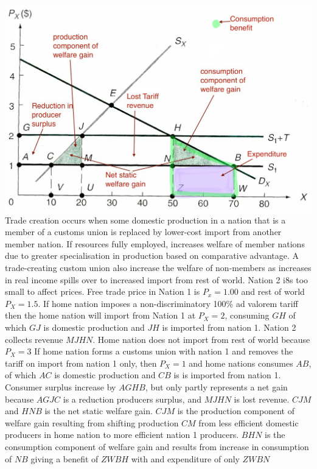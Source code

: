 \documentclass[12pt]{examnotes}
\begin{document}
\includegraphics[scale=0.4]{./imgs/101.jpg}
\ra Trade creation occurs when some domestic production in a nation that is a member of a customs union is replaced by lower-cost import from another member nation.
\ra If resources fully employed, increases welfare of member nations due to greater specialisation in production based on comparative advantage.
\ra A trade-creating custom union also increase the welfare of non-members as increases in real income spills over to increased import from rest of world.
\ra Nation 2 i8s too small to affect prices.
\ra Free trade price in Nation 1 is $P_x=1.00$ and rest of world $P_X=1.5$.
\ra If home nation imposes a non-discriminatory 100\% ad valorem tariff then the home nation will import from Nation 1 at $P_X=2$, consuming $GH$ of which $GJ$ is domestic production and $JH$
is imported from nation 1. Nation 2 collects revenue $MJHN$.
\ra Home nation does not import from rest of world because $P_X=3$
\ra If home nation forms a customs union with nation 1 and removes the tariff on import from nation 1 only, then $P_X=1$ and home nations consumes $AB$, of which $AC$ is domestic production and $CB$ is is imported from nation 1.
\ra Consumer surplus increase by $AGHB$, but only partly represents a net gain because $AGJC$ is a reduction producers surplus,  and $MJHN$ is lost revenue. $CJM$ and $HNB$ is the net static welfare gain.
\ra $CJM$ is the production component of welfare gain resulting from shifting production $CM$ from less efficient domestic producers in home nation to more efficient nation 1 producers.
\ra $BHN$ is the consumption component of welfare gain and results from increase in consumption of $NB$ giving a benefit of $ZWBH$ with and expenditure of only $ZWBN$
\end{document}

